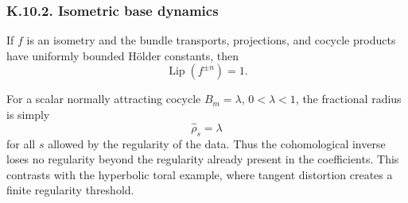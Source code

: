\documentclass[12pt,a4paper]{article}
\theoremstyle{plain}
\numberwithin{equation}{section}
\numberwithin{theorem}{section}
\begin{document}
\subsubsection{K.10.2. Isometric base dynamics}

If $f$ is an isometry and the bundle transports, projections, and cocycle products have uniformly bounded H\"older constants, then
\[
\operatorname{Lip}(f^{\pm n})=1.
\]

For a scalar normally attracting cocycle $B_m=\lambda$, $0<\lambda<1$, the fractional radius is simply
\[
\widehat\rho_s=\lambda
\]
for all $s$ allowed by the regularity of the data. Thus the cohomological inverse loses no regularity beyond the regularity already present in the coefficients. This contrasts with the hyperbolic toral example, where tangent distortion creates a finite regularity threshold.
\end{document}
